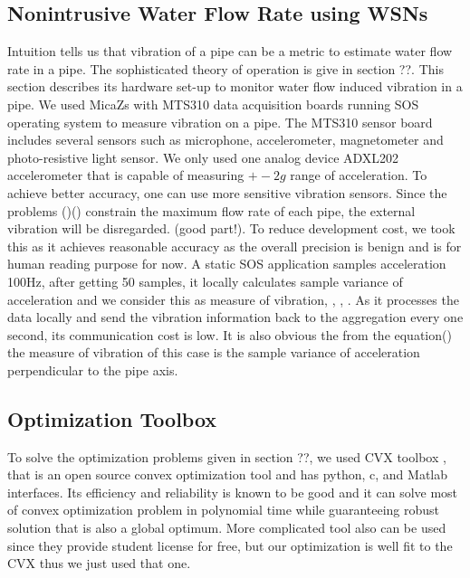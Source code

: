 \subsection{ Nonintrusive Water Flow Rate using WSNs}
  \label{subsec:vibrationsensors}
Intuition tells us that vibration of a pipe can be a metric to estimate water flow rate in a pipe. The sophisticated theory of operation is give in section ??. This section describes its hardware set-up to monitor water flow induced vibration in a pipe. 
We used MicaZs with MTS310\cite{Xbow} data acquisition boards running SOS operating system\cite{sos05mobisys} to measure vibration on a pipe. The MTS310 sensor board includes several sensors such as microphone, accelerometer, magnetometer and photo-resistive light sensor. We only used one analog device ADXL202 accelerometer that is capable of measuring $+-2g$ range of acceleration. To achieve better accuracy, one can use more sensitive vibration sensors. Since the problems ()() constrain the maximum flow rate of each pipe, the external vibration will be disregarded. (good part!). To reduce development cost, we took this as it achieves reasonable accuracy as the overall precision is benign and is for human reading purpose for now. 
A static SOS application samples acceleration 100Hz, after getting 50 samples, it locally calculates sample variance of acceleration and we consider this as measure of vibration\cite{EvansFlowMeasurement}, \cite{Bird1960}, \cite{Fogarty2006}, \cite{Pittard2003}. As it processes the data locally and send the vibration information back to the aggregation every one second, its communication cost is low. It is also obvious the from the equation() the measure of vibration of this case is the sample variance of acceleration perpendicular to the pipe axis.

\subsection{Optimization Toolbox}
  \label{subsec:optimizationtool}

To solve the optimization problems given in section ??, we used CVX toolbox \cite{CVXOPT}, \cite{BoydTutorial2005} that is an open source convex optimization tool and has python, c, and Matlab interfaces. Its efficiency and reliability is known to be good and it can solve most of convex optimization problem in polynomial time while guaranteeing robust solution that is also a global optimum. More complicated tool also can be used \cite{MOSEK} since they provide student license for free, but our optimization is well fit to the CVX thus we just used that one. 

